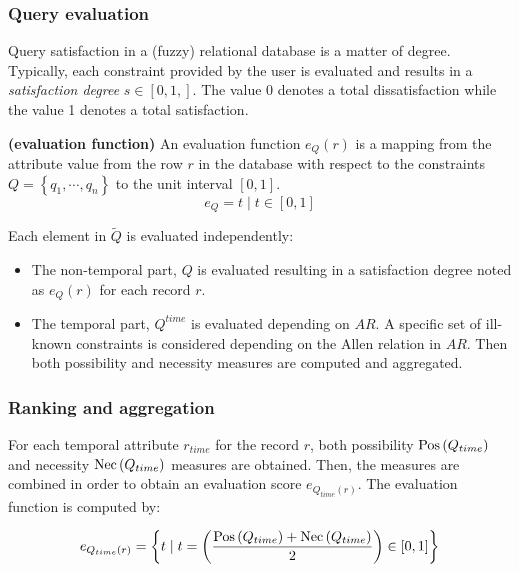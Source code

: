 \subsubsection{Query evaluation}
\label{subsubsec:query-evaluation}
Query satisfaction in a (fuzzy) relational database is a matter of degree. Typically, each constraint provided by the user is evaluated and results in a \emph{satisfaction degree} $s \in \left[ 0,1,\right]$. The value 0 denotes a total dissatisfaction while the value 1 denotes a total satisfaction.

\begin{definition}
\label{def:evaluation-function}
\textbf{(evaluation function)}
An evaluation function $e_{Q} \left( r \right)$ is a mapping from the attribute value from the row $r$ in the database with respect to the constraints $Q = \left \lbrace q_1, \cdots, q_n \right \rbrace$ to the unit interval $\left[ 0,1 \right]$. 
\begin{equation}
\label{eq:evaluation-function} 
e_{Q} = t \mid t \in \left[ 0,1 \right]
\end{equation}
\end{definition}

Each element in $\tilde{Q}$ is evaluated independently:
\begin{itemize}
\item
The non-temporal part, $Q$ is evaluated resulting in a satisfaction degree noted as $e_Q(r)$ for each record $r$.
\item
The temporal part, $Q^{time}$ is evaluated depending on $AR$. A specific set of ill-known constraints is considered depending on the Allen relation in $AR$. Then both possibility and necessity measures are computed and aggregated.
\end{itemize}

\subsubsection{Ranking and aggregation}
For each temporal attribute $r_{time}$ for the record $r$, both possibility $\operatorname{Pos} \left( Q_{time}\right)$ and necessity $\operatorname{Nec} \left( Q_{time} \right)$ measures are obtained. Then, the measures are combined in order to obtain an evaluation score $e_{Q_{time} \left( r \right)}$. The evaluation function is computed by:

\begin{equation}
\label{eq:temporal-eval}
e_{Q_{time} \left( r \right)} = \left \lbrace t \mid t = \left( \frac{\Pos \left( Q_{time}\right) + \Nec \left( Q_{time} \right)}{2} \right)   \in \left[ 0,1\right] \right \rbrace
\end{equation}

